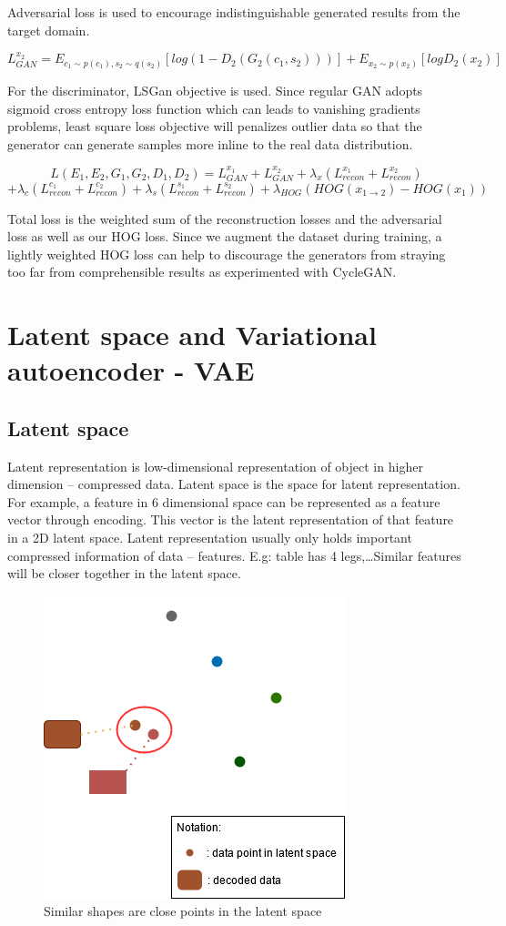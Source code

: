 \documentclass[12pt]{report}
\begin{document}
Adversarial loss is used to encourage indistinguishable generated results from the target domain.

\[L^{x_2}_{GAN} = E_{c_1\sim p(c_1), s_2\sim q(s_2)}[log(1 - D_2(G_2(c_1, s_2)))] + E_{x_2\sim p(x_2)}[log D_2(x_2)]\]

For the discriminator, LSGan objective \cite{ls-gan} is used. Since regular GAN adopts sigmoid cross entropy loss function which can leads to vanishing gradients problems, least square loss objective will penalizes outlier data so that the generator can generate samples more inline to the real data distribution.

\[L(E_1, E_2, G_1, G_2, D_1, D_2) = L^{x_1}_{GAN} + L^{x_2}_{GAN} + {\lambda}_x(L^{x_1}_{recon} + L^{x_2}_{recon}) \]
\[+ {\lambda}_c(L^{c_1}_{recon} + L^{c_2}_{recon}) + {\lambda}_s(L^{s_1}_{recon} + L^{s_2}_{recon}) + {\lambda}_{HOG}(HOG(x_{1\rightarrow 2}) - HOG(x_1))\]
 
Total loss is the weighted sum of the reconstruction losses and the adversarial loss as well as our HOG loss. Since we augment the dataset during training, a lightly weighted HOG loss can help to discourage the generators from straying too far from comprehensible results as experimented with CycleGAN.

\section{Latent space and Variational autoencoder - VAE}
\subsection{Latent space}
Latent representation is low-dimensional representation of object in higher dimension – compressed data. Latent space is the space for latent representation. For example, a feature in 6 dimensional space can be represented as a feature vector through encoding. This vector is the latent representation of that feature in a 2D latent space.
Latent representation usually only holds important compressed information of data – features. E.g: table has 4 legs,…Similar features will be closer together in the latent space.
\begin{figure}[h]
	\centering
	\includegraphics[scale=1]{latent-space}
	\caption{Similar shapes are close points in the latent space}	
	\label{fig:latent-space}
\end{figure}
\end{document}

